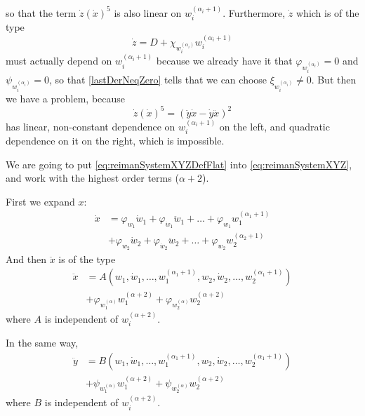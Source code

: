 \documentclass[12pt]{article}
\begin{document}
\begin{lemma}
    so that the term $\dot{z}(\dot{x})^5$ is also linear on $w_i^{(\alpha_i+1)}$.
    Furthermore, $\dot{z}$ which is of the type
    \[ \dot{z} = D + \chi_{w_i^{(\alpha_i)}}w_i^{(\alpha_i+1)} \]    
    must actually depend on $w_i^{(\alpha_i+1)}$ because we already have it that
    $\varphi_{w_i^{(\alpha_i)}} = 0$ and $\psi_{w_i^{(\alpha_i)}} = 0$, so
    that \ref{lastDerNeqZero} tells that we can choose $\xi_{w_i^{(\alpha_i)}} \neq 0$.
    But then we have a problem, because
    \[ \dot{z}(\dot{x})^5 = (\ddot{y}\dot{x} - \dot{y}\ddot{x})^2 \]
    has linear, non-constant dependence on $w_i^{(\alpha_i+1)}$ on the left, and
    quadratic dependence on it on the right, which is impossible.      
\end{lemma}

\begin{lemma}[ $\psi_{w_i^{(\alpha)}}\dot{x} - \varphi_{w_i^{(\alpha)}}\dot{y} =
  0$ ] \label{psiOmeiDotxMinuxEqZero}
  We are going to put \eqref{eq:reimanSystemXYZDefFlat} into \eqref{eq:reimanSystemXYZ},
  and work with the highest order terms ($\alpha + 2$).
  
  First we expand $x$:
  \begin{align*}
    \dot{x}
    &= \varphi_{w_1}\dot{w}_1
    + \varphi_{\dot{w}_1}\ddot{w}_1
    + \ldots
    + \varphi_{w_1}w_1^{(\alpha_1 + 1)} \\
    &+ \varphi_{w_2}\dot{w}_2
    + \varphi_{\dot{w}_2}\ddot{w}_2
    + \ldots
    + \varphi_{w_2}w_2^{(\alpha_2 + 1)}
  \end{align*}
  And then $\ddot{x}$ is of the type
  \begin{align*}
    \ddot{x}
    &= A( w_1, \dot{w}_1, \ldots, w_1^{(\alpha_1 + 1)},
    w_2, \dot{w}_2, \ldots, w_2^{(\alpha_1 + 1)} ) \\
    &+ \varphi_{w_1^{(\alpha)}}w_1^{(\alpha+2)}
    + \varphi_{w_2^{(\alpha)}}w_2^{(\alpha+2)}
  \end{align*}
  where $A$ is independent of $w_i^{(\alpha + 2)}$.
  
  In the same way,
  \begin{align*}
    \ddot{y}
    &= B( w_1, \dot{w}_1, \ldots, w_1^{(\alpha_1 + 1)},
    w_2, \dot{w}_2, \ldots, w_2^{(\alpha_1 + 1)} ) \\
    &+ \psi_{w_1^{(\alpha)}}w_1^{(\alpha+2)}
    + \psi_{w_2^{(\alpha)}}w_2^{(\alpha+2)}
  \end{align*}
  where $B$ is independent of $w_i^{(\alpha + 2)}$.
  

\end{lemma}
\end{document}
